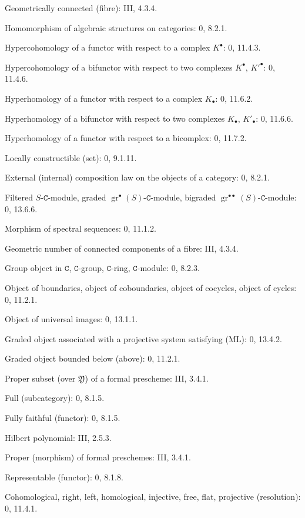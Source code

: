 \documentclass[oneside]{amsart}
\theoremstyle{ega-env-style}
\theoremstyle{ega-thm-env-style}
\theoremstyle{ega-defn-env-style}
\def\cat{\mathtt}                   %
\def\C{\cat{C}}                     %
\newcommand{\oldpage}[2][]{{\marginnote{\normalfont{\textbf{#1}~|~#2}}}\ignorespaces}
\begin{document}
\begin{flushleft}
Geometrically connected (fibre): III, 4.3.4.

Homomorphism of algebraic structures on categories: 0, 8.2.1.

Hypercohomology of a functor with respect to a complex $K^\bullet$:
0, 11.4.3.

Hypercohomology of a bifunctor with respect to two complexes
$K^\bullet$, $K'^{\bullet}$: 0, 11.4.6.

Hyperhomology of a functor with respect to a complex $K_\bullet$:
0, 11.6.2.

Hyperhomology of a bifunctor with respect to two complexes $K_\bullet$,
$K'_\bullet$: 0, 11.6.6.

Hyperhomology of a functor with respect to a bicomplex: 0, 11.7.2.

Locally constructible (set): 0, 9.1.11.

External (internal) composition law on the objects of a category: 0, 8.2.1.

\oldpage[III]{164}

Filtered $S$-$\C$-module, graded $\operatorname{gr}^\bullet(S)$-$\C$-module,
bigraded $\operatorname{gr}^{\bullet\bullet}(S)$-$\C$-module: 0, 13.6.6.

Morphism of spectral sequences: 0, 11.1.2.

Geometric number of connected components of a fibre: III, 4.3.4.

Group object in $\C$, $\C$-group, $\C$-ring, $\C$-module: 0, 8.2.3.

Object of boundaries, object of coboundaries, object of cocycles, object of
cycles: 0, 11.2.1.

Object of universal images: 0, 13.1.1.

Graded object associated with a projective system satisfying (ML): 0, 13.4.2.

Graded object bounded below (above): 0, 11.2.1.

Proper subset (over $\mathfrak Y$) of a formal prescheme: III, 3.4.1.

Full (subcategory): 0, 8.1.5.

Fully faithful (functor): 0, 8.1.5.

Hilbert polynomial: III, 2.5.3.

Proper (morphism) of formal preschemes: III, 3.4.1.

Representable (functor): 0, 8.1.8.

Cohomological, right, left, homological, injective, free, flat, projective
(resolution): 0, 11.4.1.


\end{flushleft}
\end{document}
